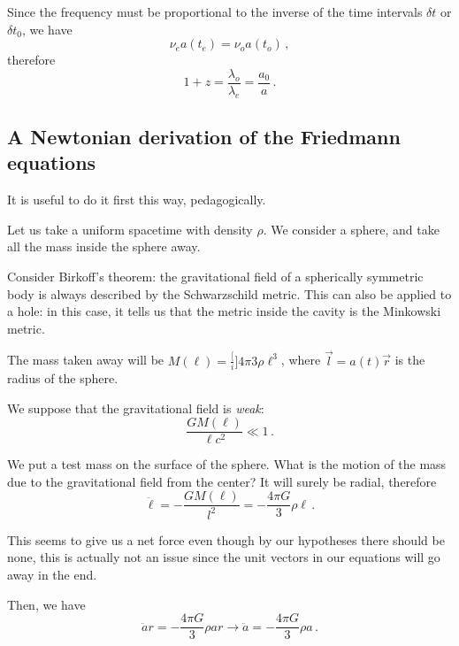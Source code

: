 \documentclass[main.tex]{subfiles}
\begin{document}
Since the frequency must be proportional to the inverse of the time intervals \(\delta t\) or \(\delta t_0 \), we have
\begin{equation}
  \nu_{e} a(t_{e}) = \nu_{o} a(t_{o})\,,
\end{equation}
%
therefore 
%
\begin{equation}
  1 + z = \frac{\lambda_{o}}{\lambda_{e}}
  = \frac{a_0 }{a}\,.
\end{equation}

\subsection{A Newtonian derivation of the Friedmann equations}

It is useful to do it first this way, pedagogically.

Let us take a uniform spacetime with density \(\rho\). We consider a sphere, and take all the mass inside the sphere away.

Consider Birkoff's theorem: the gravitational field of a spherically symmetric body is always described by the Schwarzschild metric.
This can also be applied to a hole: in this case, it tells us that the metric inside the cavity is the Minkowski metric.

The mass taken away will be \(M(\ell) = \frac[i]{4 \pi}{3} \rho \ell^{3}\), where \(\vec{l} = a(t) \vec{r}\) is the radius of the sphere.

We suppose that the gravitational field is \emph{weak}:
\begin{equation}
  \frac{GM(\ell)}{\ell c^2} \ll 1\,.
\end{equation}

We put a test mass on the surface of the sphere. What is the motion of the mass due to the gravitational field from the center? It will surely be radial, therefore
\begin{equation}
  \ddot{\ell} = - \frac{GM(\ell)}{l^2} = - \frac{4 \pi G}{3} \rho \ell\,.
\end{equation}

This seems to give us a net force even though by our hypotheses there should be none, this is actually not an issue since the unit vectors in our equations will go away in the end.

Then, we have
\begin{equation}
  \ddot{a} r = - \frac{4 \pi G}{3} \rho a r
  \to
  \ddot{a} = - \frac{4 \pi G}{3} \rho a\,.
\end{equation}
\end{document}
